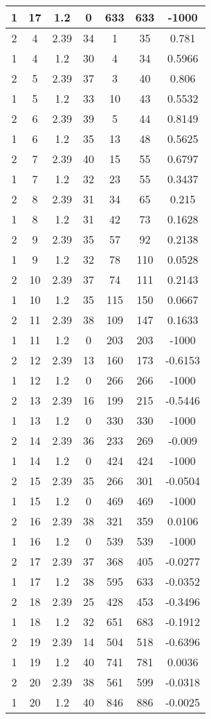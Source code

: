 \documentclass[letterpaper, 12pt]{article}
\begin{document}
\begin{longtable}{|c|c|c|c|c|c|c|}
\hline
1 & 17 & 1.2 & 0 & 633 & 633 & -1000 \\
\hline
2 & 4 & 2.39 & 34 & 1 & 35 & 0.781 \\
\hline
1 & 4 & 1.2 & 30 & 4 & 34 & 0.5966 \\
\hline
2 & 5 & 2.39 & 37 & 3 & 40 & 0.806 \\
\hline
1 & 5 & 1.2 & 33 & 10 & 43 & 0.5532 \\
\hline
2 & 6 & 2.39 & 39 & 5 & 44 & 0.8149 \\
\hline
1 & 6 & 1.2 & 35 & 13 & 48 & 0.5625 \\
\hline
2 & 7 & 2.39 & 40 & 15 & 55 & 0.6797 \\
\hline
1 & 7 & 1.2 & 32 & 23 & 55 & 0.3437 \\
\hline
2 & 8 & 2.39 & 31 & 34 & 65 & 0.215 \\
\hline
1 & 8 & 1.2 & 31 & 42 & 73 & 0.1628 \\
\hline
2 & 9 & 2.39 & 35 & 57 & 92 & 0.2138 \\
\hline
1 & 9 & 1.2 & 32 & 78 & 110 & 0.0528 \\
\hline
2 & 10 & 2.39 & 37 & 74 & 111 & 0.2143 \\
\hline
1 & 10 & 1.2 & 35 & 115 & 150 & 0.0667 \\
\hline
2 & 11 & 2.39 & 38 & 109 & 147 & 0.1633 \\
\hline
1 & 11 & 1.2 & 0 & 203 & 203 & -1000 \\
\hline
2 & 12 & 2.39 & 13 & 160 & 173 & -0.6153 \\
\hline
1 & 12 & 1.2 & 0 & 266 & 266 & -1000 \\
\hline
2 & 13 & 2.39 & 16 & 199 & 215 & -0.5446 \\
\hline
1 & 13 & 1.2 & 0 & 330 & 330 & -1000 \\
\hline
2 & 14 & 2.39 & 36 & 233 & 269 & -0.009 \\
\hline
1 & 14 & 1.2 & 0 & 424 & 424 & -1000 \\
\hline
2 & 15 & 2.39 & 35 & 266 & 301 & -0.0504 \\
\hline
1 & 15 & 1.2 & 0 & 469 & 469 & -1000 \\
\hline
2 & 16 & 2.39 & 38 & 321 & 359 & 0.0106 \\
\hline
1 & 16 & 1.2 & 0 & 539 & 539 & -1000 \\
\hline
2 & 17 & 2.39 & 37 & 368 & 405 & -0.0277 \\
\hline
1 & 17 & 1.2 & 38 & 595 & 633 & -0.0352 \\
\hline
2 & 18 & 2.39 & 25 & 428 & 453 & -0.3496 \\
\hline
1 & 18 & 1.2 & 32 & 651 & 683 & -0.1912 \\
\hline
2 & 19 & 2.39 & 14 & 504 & 518 & -0.6396 \\
\hline
1 & 19 & 1.2 & 40 & 741 & 781 & 0.0036 \\
\hline
2 & 20 & 2.39 & 38 & 561 & 599 & -0.0318 \\
\hline
1 & 20 & 1.2 & 40 & 846 & 886 & -0.0025 \\
\hline
\end{longtable}
\end{document}
